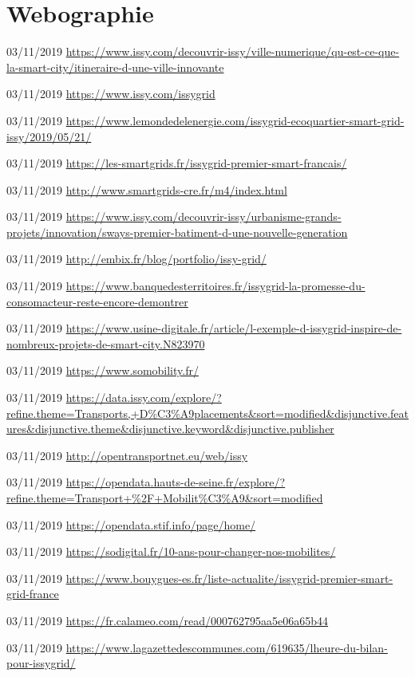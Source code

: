 \chapter*{Webographie}

03/11/2019
\url{https://www.issy.com/decouvrir-issy/ville-numerique/qu-est-ce-que-la-smart-city/itineraire-d-une-ville-innovante}

03/11/2019
\url{https://www.issy.com/issygrid}

03/11/2019
\url{https://www.lemondedelenergie.com/issygrid-ecoquartier-smart-grid-issy/2019/05/21/}

03/11/2019
\url{https://les-smartgrids.fr/issygrid-premier-smart-francais/}

03/11/2019
\url{http://www.smartgrids-cre.fr/m4/index.html}

03/11/2019
\url{https://www.issy.com/decouvrir-issy/urbanisme-grands-projets/innovation/sways-premier-batiment-d-une-nouvelle-generation}

03/11/2019
\url{http://embix.fr/blog/portfolio/issy-grid/}

03/11/2019
\url{https://www.banquedesterritoires.fr/issygrid-la-promesse-du-consomacteur-reste-encore-demontrer}

03/11/2019
\url{https://www.usine-digitale.fr/article/l-exemple-d-issygrid-inspire-de-nombreux-projets-de-smart-city.N823970}

03/11/2019
\url{https://www.somobility.fr/}

03/11/2019
\url{https://data.issy.com/explore/?refine.theme=Transports,+D\%C3\%A9placements\&sort=modified\&disjunctive.features\&disjunctive.theme\&disjunctive.keyword\&disjunctive.publisher}

03/11/2019
\url{http://opentransportnet.eu/web/issy}

03/11/2019
\url{https://opendata.hauts-de-seine.fr/explore/?refine.theme=Transport+\%2F+Mobilit\%C3\%A9\&sort=modified}

03/11/2019
\url{https://opendata.stif.info/page/home/}

03/11/2019
\url{https://sodigital.fr/10-ans-pour-changer-nos-mobilites/}

03/11/2019
\url{https://www.bouygues-es.fr/liste-actualite/issygrid-premier-smart-grid-france}

03/11/2019
\url{https://fr.calameo.com/read/000762795aa5e06a65b44}

03/11/2019
\url{https://www.lagazettedescommunes.com/619635/lheure-du-bilan-pour-issygrid/}


